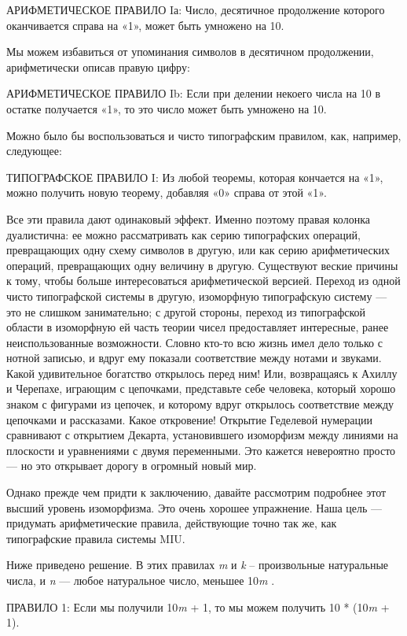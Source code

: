 \documentclass[../main.tex]{subfiles}
\begin{document}
АРИФМЕТИЧЕСКОЕ ПРАВИЛО Iа: Число, десятичное продолжение которого оканчивается справа на «1», может быть умножено на 10.

Мы можем избавиться от упоминания символов в десятичном продолжении, арифметически описав правую цифру:

АРИФМЕТИЧЕСКОЕ ПРАВИЛО Ib: Если при делении некоего числа на 10 в остатке получается «1», то это число может быть умножено на 10.

Можно было бы воспользоваться и чисто типографским правилом, как, например, следующее:

ТИПОГРАФСКОЕ ПРАВИЛО I: Из любой теоремы, которая кончается на «1», можно получить новую теорему, добавляя «0» справа от этой «1».

Все эти правила дают одинаковый эффект. Именно поэтому правая колонка дуалистична: ее можно рассматривать как серию типографских операций, превращающих одну схему символов в другую, или как серию арифметических операций, превращающих одну величину в другую. Существуют веские причины к тому, чтобы больше интересоваться арифметической версией. Переход из одной чисто типографской системы в другую, изоморфную типографскую систему --- это не слишком занимательно; с другой стороны, переход из типографской области в изоморфную ей часть теории чисел предоставляет интересные, ранее неиспользованные возможности. Словно кто-то всю жизнь имел дело только с нотной записью, и вдруг ему показали соответствие между нотами и звуками. Какой удивительное богатство открылось перед ним! Или, возвращаясь к Ахиллу и Черепахе, играющим с цепочками, представьте себе человека, который хорошо знаком с фигурами из цепочек, и которому вдруг открылось соответствие между цепочками и рассказами. Какое откровение! Открытие Геделевой нумерации сравнивают с открытием Декарта, установившего изоморфизм между линиями на плоскости и уравнениями с двумя переменными. Это кажется невероятно просто --- но это открывает дорогу в огромный новый мир.

Однако прежде чем придти к заключению, давайте рассмотрим подробнее этот высший уровень изоморфизма. Это очень хорошее упражнение. Наша цель --- придумать арифметические правила, действующие точно так же, как типографские правила системы MIU.

Ниже приведено решение. В этих правилах \emph{m} и \emph{k} \--- произвольные натуральные числа, и \emph{n} --- любое натуральное число, меньшее 10\emph{m} .

ПРАВИЛО 1: Если мы получили 10\emph{m} + 1, то мы можем получить 10 * (10\emph{m} + 1).
\end{document}

